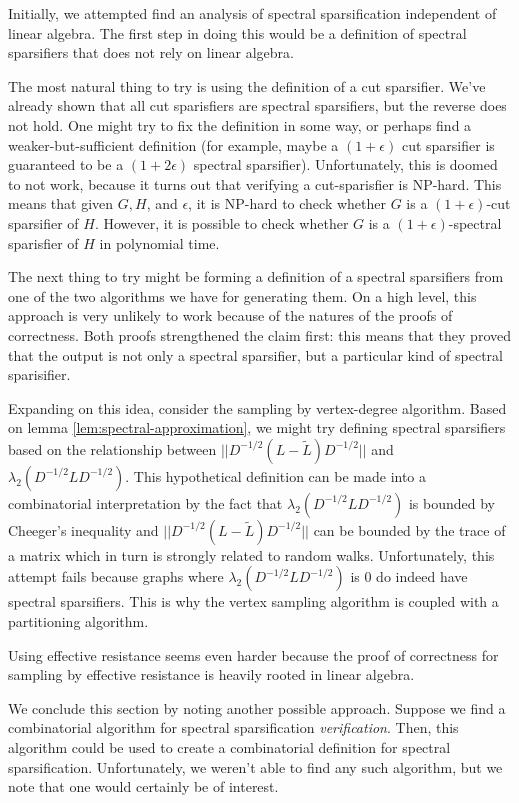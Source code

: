 \documentclass[12pt,twoside]{article}
\begin{document}
Initially, we attempted find an analysis of spectral sparsification independent of linear algebra. The first step in doing this would be a definition of spectral sparsifiers that does not rely on linear algebra. 

The most natural thing to try is using the definition of a cut sparsifier. We've already shown that all cut sparisfiers are spectral sparsifiers, but the reverse does not hold. One might try to fix the definition in some way, or perhaps find a weaker-but-sufficient definition (for example, maybe a $(1 + \epsilon)$ cut sparsifier is guaranteed to be a $(1 + 2\epsilon)$ spectral sparsifier). Unfortunately, this is doomed to not work, because it turns out that verifying a cut-sparisfier is NP-hard. This means that given $G, H$, and $\epsilon$, it is NP-hard to check whether $G$ is a $(1+\epsilon)$-cut sparsifier of $H$. However, it is possible to check whether $G$ is a $(1 + \epsilon)$-spectral sparisfier of $H$ in polynomial time.

The next thing to try might be forming a definition of a spectral sparsifiers from one of the two algorithms we have for generating them. On a high level, this approach is very unlikely to work because of the natures of the proofs of correctness. Both proofs strengthened the claim first: this means that they proved that the output is not only a spectral sparsifier, but a particular kind of spectral sparisifier.

Expanding on this idea, consider the sampling by vertex-degree algorithm. Based on lemma \ref{lem:spectral-approximation},  we might try defining spectral sparsifiers based on the relationship between $||D^{-1/2}(L - \tilde{L})D^{-1/2}||$ and $\lambda_2(D^{-1/2}LD^{-1/2})$. This hypothetical definition can be made into a combinatorial interpretation by the fact that $\lambda_2(D^{-1/2}LD^{-1/2})$ is bounded by Cheeger's inequality and $||D^{-1/2}(L - \tilde{L})D^{-1/2}||$ can be bounded by the trace of a matrix which in turn is strongly related to random walks. Unfortunately, this attempt fails because graphs where $\lambda_2(D^{-1/2}LD^{-1/2})$ is 0 do indeed have spectral sparsifiers. This is why the vertex sampling algorithm is coupled with a partitioning algorithm. 

Using effective resistance seems even harder because the proof of correctness for sampling by effective resistance is heavily rooted in linear algebra. 

We conclude this section by noting another possible approach. Suppose we find a combinatorial algorithm for spectral sparsification \emph{verification}. Then, this algorithm could be used to create a combinatorial definition for spectral sparsification. Unfortunately, we weren't able to find any such algorithm, but we note that one would certainly be of interest.
\end{document}
